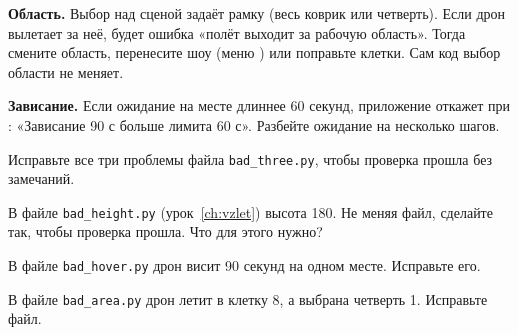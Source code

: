 \textbf{Область.} Выбор  над сценой задаёт рамку (весь коврик или четверть). Если дрон вылетает за неё, будет ошибка «полёт выходит за рабочую область». Тогда смените область, перенесите шоу (меню ) или поправьте клетки. Сам код выбор области не меняет.

\textbf{Зависание.} Если ожидание на месте длиннее 60 секунд, приложение откажет при : «Зависание 90 с больше лимита 60 с». Разбейте ожидание на несколько шагов.

\begin{probuy}
  \item Исправьте все три проблемы файла \texttt{bad\_three.py}, чтобы проверка прошла без замечаний.
  \item В файле \texttt{bad\_height.py} (урок~\ref{ch:vzlet}) высота 180\cm. Не меняя файл, сделайте так, чтобы проверка прошла. Что для этого нужно?
  \item В файле \texttt{bad\_hover.py} дрон висит 90 секунд на одном месте. Исправьте его.
  \item В файле \texttt{bad\_area.py} дрон летит в клетку 8, а выбрана четверть 1. Исправьте файл.
\end{probuy}
